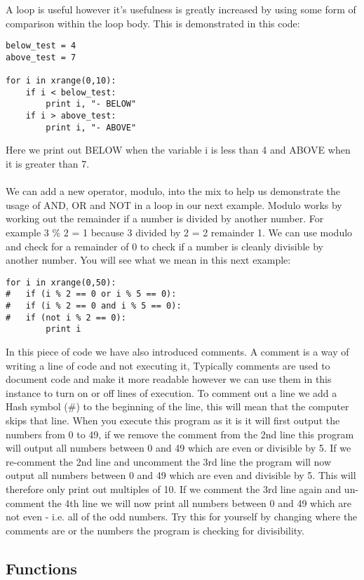 \documentclass[twocolumn]{article}
\begin{document}
A loop is useful however it's usefulness is greatly increased by using some form of comparison within the loop body. This is demonstrated in this code:
\begin{lstlisting}
below_test = 4
above_test = 7

for i in xrange(0,10):
	if i < below_test:
		print i, "- BELOW"
	if i > above_test:
		print i, "- ABOVE"
\end{lstlisting}
Here we print out BELOW when the variable i is less than 4 and ABOVE when it is greater than 7.\\
\\
We can add a new operator, modulo, into the mix to help us demonstrate the usage of AND, OR and NOT in a loop in our next example. Modulo works by working out the remainder if a number is divided by another number. For example 3 \% 2 = 1 because 3 divided by 2 = 2 remainder 1. We can use modulo and check for a remainder of 0 to check if a number is cleanly divisible by another number. You will see what we mean in this next example:
 \begin{lstlisting}
for i in xrange(0,50):
#	if (i % 2 == 0 or i % 5 == 0):
#	if (i % 2 == 0 and i % 5 == 0):
#	if (not i % 2 == 0):
		print i
\end{lstlisting}
In this piece of code we have also introduced comments. A comment is a way of writing a line of code and not executing it, Typically comments are used to document code and make it more readable however we can use them in this instance to turn on or off lines of execution. To comment out a line we add a Hash symbol (\#) to the beginning of the line, this will mean that the computer skips that line. When you execute this program as it is it will first output the numbers from 0 to 49, if we remove the comment from the 2nd line this program will output all numbers between 0 and 49 which are even or divisible by 5. If we re-comment the 2nd line and uncomment the 3rd line the program will now output all numbers between 0 and 49 which are even and divisible by 5. This will therefore only print out multiples of 10. If we comment the 3rd line again and un-comment the 4th line we will now print all numbers between 0 and 49 which are not even - i.e. all of the odd numbers. Try this for yourself by changing where the comments are or the numbers the program is checking for divisibility.

\subsection{Functions}
\end{document}
